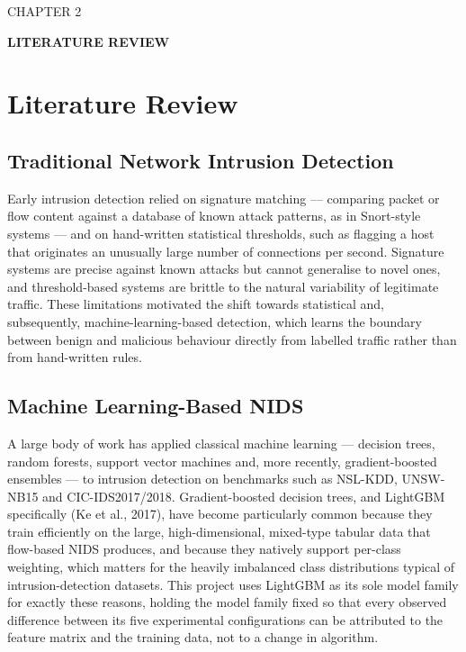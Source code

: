 \documentclass[12pt,a4paper]{report}
\begin{document}
\begin{center}CHAPTER 2\end{center}
\begin{center}\textbf{LITERATURE REVIEW}\end{center}\vspace{4pt}
\chapter{Literature Review}
\section{Traditional Network Intrusion Detection}
Early intrusion detection relied on signature matching --- comparing packet or flow content against a database of known attack patterns, as in Snort-style systems --- and on hand-written statistical thresholds, such as flagging a host that originates an unusually large number of connections per second. Signature systems are precise against known attacks but cannot generalise to novel ones, and threshold-based systems are brittle to the natural variability of legitimate traffic. These limitations motivated the shift towards statistical and, subsequently, machine-learning-based detection, which learns the boundary between benign and malicious behaviour directly from labelled traffic rather than from hand-written rules.

\section{Machine Learning-Based NIDS}
A large body of work has applied classical machine learning --- decision trees, random forests, support vector machines and, more recently, gradient-boosted ensembles --- to intrusion detection on benchmarks such as NSL-KDD, UNSW-NB15 and CIC-IDS2017/2018. Gradient-boosted decision trees, and LightGBM specifically (Ke et al., 2017), have become particularly common because they train efficiently on the large, high-dimensional, mixed-type tabular data that flow-based NIDS produces, and because they natively support per-class weighting, which matters for the heavily imbalanced class distributions typical of intrusion-detection datasets. This project uses LightGBM as its sole model family for exactly these reasons, holding the model family fixed so that every observed difference between its five experimental configurations can be attributed to the feature matrix and the training data, not to a change in algorithm.
\end{document}
